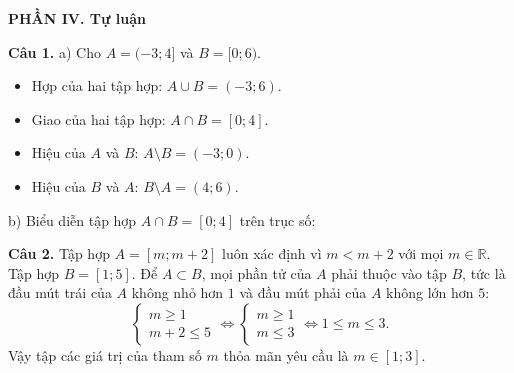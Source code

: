 \documentclass[12pt,a4paper]{article}
\begin{document}
\vspace{0.2cm}
\textbf{\large PHẦN IV. Tự luận}

\textbf{Câu 1.}
a) Cho $A = (-3; 4]$ và $B = [0; 6)$.
\begin{itemize}[leftmargin=0.5cm, itemsep=1pt, topsep=1pt]
    \item Hợp của hai tập hợp: $A \cup B = (-3; 6)$.
    \item Giao của hai tập hợp: $A \cap B = [0; 4]$.
    \item Hiệu của $A$ và $B$: $A \setminus B = (-3; 0)$.
    \item Hiệu của $B$ và $A$: $B \setminus A = (4; 6)$.
\end{itemize}
b) Biểu diễn tập hợp $A \cap B = [0; 4]$ trên trục số:

\begin{center}
\end{center}

\textbf{Câu 2.} Tập hợp $A = [m; m + 2]$ luôn xác định vì $m < m + 2$ với mọi $m \in \mathbb{R}$.
Tập hợp $B = [1; 5]$.
Để $A \subset B$, mọi phần tử của $A$ phải thuộc vào tập $B$, tức là đầu mút trái của $A$ không nhỏ hơn $1$ và đầu mút phải của $A$ không lớn hơn $5$:
\[
\begin{cases}
m \ge 1 \\
m + 2 \le 5
\end{cases}
\iff
\begin{cases}
m \ge 1 \\
m \le 3
\end{cases}
\iff 1 \le m \le 3.
\]
Vậy tập các giá trị của tham số $m$ thỏa mãn yêu cầu là $m \in [1; 3]$.
\end{document}
